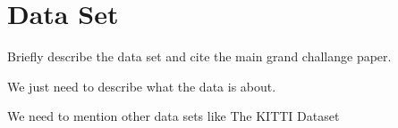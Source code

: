 \section{Data Set}

Briefly describe the data set and cite the main grand challange paper. 

We just need to describe what the data is about. 


\cite{DEBSGC2019}



We need to mention other data sets like The KITTI Dataset \cite{Geiger2013IJRR}